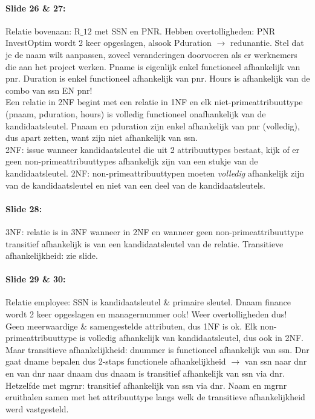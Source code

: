 \documentclass[10pt,a4paper]{report}
\begin{document}
\paragraph{Slide 26 \& 27:}Relatie bovenaan: R$\_{12}$ met SSN en PNR. Hebben overtolligheden: PNR InvestOptim wordt 2 keer opgeslagen, alsook Pduration $\rightarrow$ redunantie. Stel dat je de naam wilt aanpassen, zoveel veranderingen doorvoeren als er werknemers die aan het project werken. Pname is eigenlijk enkel functioneel afhankelijk van pnr. Duration is enkel functioneel afhankelijk van pnr. Hours is afhankelijk van de combo van ssn EN pnr! \\
Een relatie in 2NF begint met een relatie in 1NF en elk niet-primeattribuuttype (pnaam, pduration, hours) is volledig functioneel onafhankelijk van de kandidaatsleutel. Pnaam en pduration zijn enkel afhankelijk van pnr (volledig), dus apart zetten, want zijn niet afhankelijk van ssn.\\
2NF: issue wanneer kandidaatsleutel die uit 2 attribuuttypes bestaat, kijk of er geen non-primeattribuuttypes afhankelijk zijn van een stukje van de kandidaatsleutel.
2NF: non-primeattribuuttypen moeten \emph{volledig} afhankelijk zijn van de kandidaatsleutel en niet van een deel van de kandidaatsleutels.

\paragraph{Slide 28:}3NF: relatie is in 3NF wanneer in 2NF en wanneer geen non-primeattribuuttype transitief afhankelijk is van een kandidaatsleutel van de relatie.
Transitieve afhankelijkheid: zie slide.

\paragraph{Slide 29 \& 30:}Relatie employee: SSN is kandidaatsleutel \& primaire sleutel. Dnaam finance wordt 2 keer opgeslagen en managernummer ook! Weer overtolligheden dus!\\
Geen meerwaardige \& samengestelde attributen, dus 1NF is ok. Elk non-primeattribuuttype is volledig afhankelijk van kandidaatsleutel, dus ook in 2NF. Maar transitieve afhankelijkheid: dnummer is functioneel afhankelijk van ssn. Dnr gaat dname bepalen dus 2-staps functionele afhankelijkheid $\rightarrow$ van ssn naar dnr en van dnr naar dnaam dus dnaam is transitief afhankelijk van ssn via dnr. Hetzelfde met mgrnr: transitief afhankelijk van ssn via dnr.
Naam en mgrnr eruithalen samen met het attribuuttype langs welk de transitieve afhankelijkheid werd vastgesteld.
\end{document}
